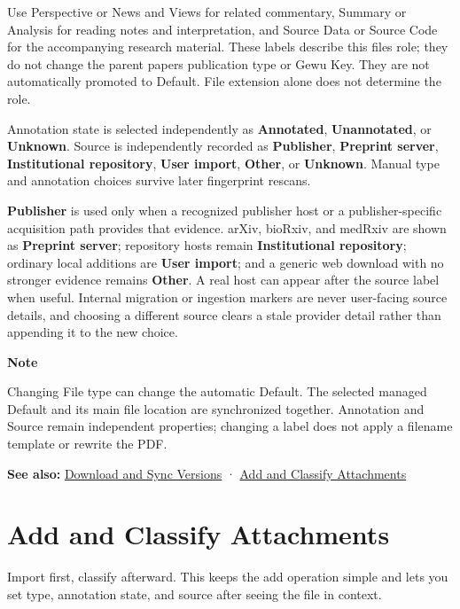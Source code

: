 \documentclass[10pt,letterpaper,oneside]{scrreprt}
\newenvironment{GewuRelated}{\par\nobreak\vspace{3pt}\nobreak\begingroup\small\sffamily\begin{samepage}\noindent}{\par\end{samepage}\endgroup}
\newenvironment{GewuLead}
  {\begin{list}{}{\leftmargin=0pt\rightmargin=0pt\topsep=0pt\partopsep=0pt\parsep=0pt}\item\relax
    \sffamily\fontsize{10.5}{13.2}\selectfont\color{GewuMuted}}
  {\end{list}}
\renewenvironment{quote}
  {\Needspace{5\baselineskip}\begin{tcolorbox}[enhanced,breakable,colback=GewuPale,colframe=GewuPale,boxrule=0pt,
    borderline west={1.6pt}{0pt}{GewuBlue},arc=1.2mm,left=2.5mm,right=2.5mm,top=1.7mm,bottom=1.7mm,
    before skip=4pt,after skip=5pt,fontupper=\color{GewuInk}\small]}
  {\end{tcolorbox}}
\begin{document}
Use Perspective or News and Views for related commentary, Summary or Analysis for reading notes and interpretation, and Source Data or Source Code for the accompanying research material. These labels describe this file\textquotesingle s role; they do not change the parent paper\textquotesingle s publication type or Gewu Key. They are not automatically promoted to Default. File extension alone does not determine the role.

Annotation state is selected independently as \textbf{Annotated}, \textbf{Unannotated}, or \textbf{Unknown}. Source is independently recorded as \textbf{Publisher}, \textbf{Preprint server}, \textbf{Institutional repository}, \textbf{User import}, \textbf{Other}, or \textbf{Unknown}. Manual type and annotation choices survive later fingerprint rescans.

\textbf{Publisher} is used only when a recognized publisher host or a publisher-specific acquisition path provides that evidence. arXiv, bioRxiv, and medRxiv are shown as \textbf{Preprint server}; repository hosts remain \textbf{Institutional repository}; ordinary local additions are \textbf{User import}; and a generic web download with no stronger evidence remains \textbf{Other}. A real host can appear after the source label when useful. Internal migration or ingestion markers are never user-facing source details, and choosing a different source clears a stale provider detail rather than appending it to the new choice.

\begin{quote}
\textbf{Note}

Changing File type can change the automatic Default. The selected managed Default and its main file location are synchronized together. Annotation and Source remain independent properties; changing a label does not apply a filename template or rewrite the PDF.
\end{quote}

\begin{GewuRelated}
\textbf{See also:} \hyperref[download-sync]{Download and Sync Versions} · \hyperref[attachments]{Add and Classify Attachments}
\end{GewuRelated}

\section{Add and Classify Attachments}\label{attachments}

\begin{GewuLead}
Import first, classify afterward. This keeps the add operation simple and lets you set type, annotation state, and source after seeing the file in context.
\end{GewuLead}
\end{document}
